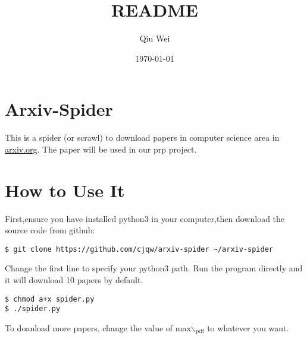 \documentclass[11pt]{article}
\author{Qiu Wei}
\date{\today}
\title{README}
\begin{document}
\maketitle
\tableofcontents

\section{Arxiv-Spider}
\label{sec-1}
This is a spider (or scrawl) to download papers in computer science area in \href{http://arxiv.org/}{arxiv.org}.
The paper will be used in our prp project.
\section{How to Use It}
\label{sec-2}
First,ensure you have installed python3 in your computer,then download the source code
from github:
\begin{verbatim}
$ git clone https://github.com/cjqw/arxiv-spider ~/arxiv-spider
\end{verbatim}
Change the first line to specify your python3 path.
Run the program directly and it will download 10 papers by default.
\begin{verbatim}
$ chmod a+x spider.py
$ ./spider.py
\end{verbatim}
To doanload more papers, change the value of max$\backslash$$_{\text{pdf}}$ to whatever you want.
\end{document}
